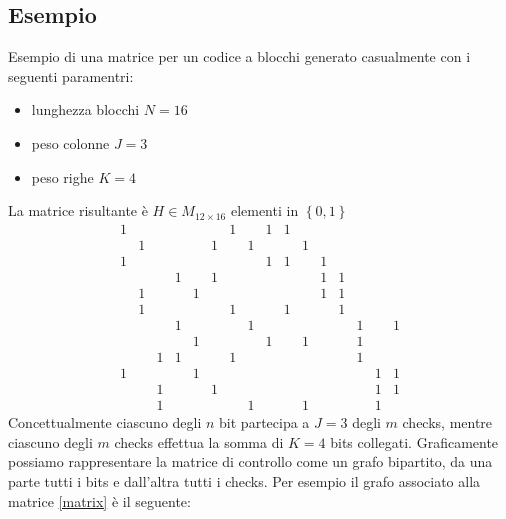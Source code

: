 \documentclass{article}
\begin{document}
	\subsection{Esempio}
	Esempio di una matrice per un codice a blocchi generato casualmente con i seguenti paramentri:
	\begin{itemize}
		\item lunghezza blocchi $N = 16$
		\item peso colonne $J  = 3$
		\item peso righe $K = 4$
	\end {itemize}
	La matrice risultante è $H \in M_{12 \times 16}$ elementi in $\left\{0,1\right\}$
	\begin{equation} \label{matrix}
		\begin{smallmatrix}
			1& & & & & &1& &1&1& & & & & &  \\
			 &1& & & &1& &1& & &1& & & & &  \\
			1& & & & & & & &1&1& &1& & & &  \\
			 & & &1& &1& & & & & &1&1& & &  \\
			 &1& & &1& & & & & & &1&1& & &  \\
			 &1& & & & &1& & &1& & &1& & &  \\
			 & & &1& & & &1& & & & & &1& &1 \\
			 & & & &1& & & &1& &1& & &1& &  \\
			 & &1&1& & &1& & & & & & &1& &  \\
			1& & & &1& & & & & & & & & &1&1 \\
			 & &1& & &1& & & & & & & & &1&1 \\
			 & &1& & & & &1& & &1& & & &1& 
		\end{smallmatrix}
	\end{equation}
	Concettualmente ciascuno degli $n$ bit partecipa a $J = 3$ degli $m$ checks, mentre ciascuno degli $m$ checks effettua la somma di $K = 4$ bits collegati.
	Graficamente possiamo rappresentare la matrice di controllo come un grafo bipartito, da una parte tutti i bits e dall'altra tutti i checks. Per esempio il grafo associato alla matrice \ref{matrix} è il seguente:
\end{document}
